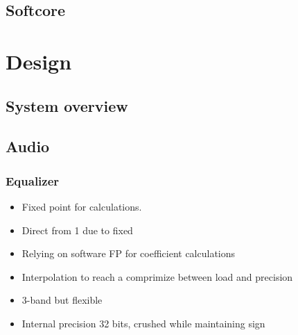 \documentclass[12p]{article}
\begin{document}
\subsection{Softcore}
\label{Theory:Softcore}


\newpage
\section{Design}
\label{Design}
\subsection{System overview}
\label{Design:SystemOverview}

\subsection{Audio}
\label{Design:Audio}
\subsubsection{Equalizer}
\begin{itemize}
\item Fixed point for calculations.
\item Direct from 1 due to fixed
\item Relying on software FP for coefficient calculations
\item Interpolation to reach a comprimize between load and precision
\item 3-band but flexible
\item Internal precision 32 bits, crushed while maintaining sign
\end{itemize}
\end{document}
